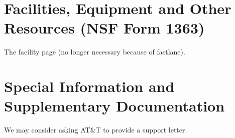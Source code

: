 \documentclass[11pt]{article}
\begin{document}
\section{Facilities, Equipment and Other Resources (NSF Form 1363)}

The facility page (no longer necessary because of fastlane).

\section{Special Information and Supplementary Documentation}

We may consider asking AT\&{}T to provide a support letter.
\end{document}
